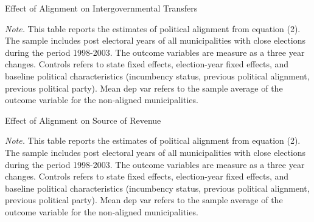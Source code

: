 \documentclass[dv_diss_main.tex]{subfiles}
\begin{document}
\begin{table}[h]
    \small
    \begin{center}
        \caption{Effect of Alignment on Intergovernmental Transfers}\label{tab:1trans} 
        \resizebox{!}{!}{}
    \end{center}
    \begin{tablenotes}
    \vspace{0.5em}
    \footnotesize	
	\textit{Note. }This table reports the estimates of political alignment from equation (2). The sample includes post electoral years of all municipalities with close elections during the period 1998-2003. The outcome variables are measure as a three year changes. Controls refers to state fixed effects, election-year fixed effects, and baseline political characteristics (incumbency status, previous political alignment, previous political party). Mean dep var refers to the sample average of the outcome variable for the non-aligned municipalities.
    \end{tablenotes}
\end{table}

\newpage

\begin{table}[h]
    \small
    \begin{center}
        \caption{{Effect of Alignment on Source of Revenue}}\label{tab:2revenues}
        \resizebox{!}{!}{}
    \end{center}
    \begin{tablenotes}
    \vspace{0.5em}
    \footnotesize
	\textit{Note. }This table reports the estimates of political alignment from equation (2). The sample includes post electoral years of all municipalities with close elections during the period 1998-2003. The outcome variables are measure as a three year changes. Controls refers to state fixed effects, election-year fixed effects, and baseline political characteristics (incumbency status, previous political alignment, previous political party). Mean dep var refers to the sample average of the outcome variable for the non-aligned municipalities.
    \end{tablenotes}
    
\end{table}     

\newpage
\end{document}
